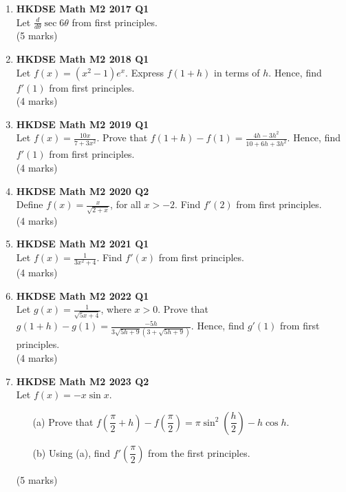\documentclass{report}
\begin{document}
\begin{enumerate}
	\item \textbf{HKDSE Math M2 2017 Q1}\\
	Let $\displaystyle \frac{d}{d\theta} \sec{6\theta}$ from first principles. \\(5 marks)	

	\item \textbf{HKDSE Math M2 2018 Q1}\\
	Let $\displaystyle f(x) = (x^2-1)e^x$.  Express $f(1+h)$ in terms of $h$. Hence, find  $f'(1)$ from first principles. \\(4 marks)

    \newpage

	\item \textbf{HKDSE Math M2 2019 Q1}\\
	Let $\displaystyle f(x) = \frac{10x}{7+3x^2}$. Prove that $f(1+h) - f(1) = \displaystyle\frac{4h-3h^2}{10+6h+3h^2}$. Hence, find  $f'(1)$ from first principles. \\(4 marks)

	\item \textbf{HKDSE Math M2 2020 Q2}\\
	Define $\displaystyle f(x) = \frac{x}{\sqrt{2+x}}$, for all $x > -2$. Find $f'(2)$ from first principles. \\(4 marks)

	\item \textbf{HKDSE Math M2 2021 Q1}\\
	Let $\displaystyle f(x) = \frac{1}{3x^{2}+4}$. Find $f'(x)$ from first principles. \\(4 marks)

	\item \textbf{HKDSE Math M2 2022 Q1}\\
	Let $\displaystyle g(x) = \frac{1}{\sqrt{5x+4}}$, where $x > 0$. Prove that $\displaystyle g(1+h)-g(1) = \frac{-5h}{3\sqrt{5h+9}(3+\sqrt{5h+9})}$. Hence, find $g'(1)$ from first principles. \\
	(4 marks)

	\item \textbf{HKDSE Math M2 2023 Q2}\\
	Let $f(x) = -x \sin{x}$.
	\begin{enumerate}
		\item [(a)]Prove that $f\left(\dfrac{\pi}{2} + h\right) - f\left(\dfrac{\pi}{2}\right) = \pi \sin^2{\left(\dfrac{h}{2}\right)} - h \cos{h}$.
		\item [(b)]Using (a), find $f'\left(\dfrac{\pi}{2}\right)$ from the first principles.
	\end{enumerate}
	(5 marks)

\end{enumerate}
\end{document}
